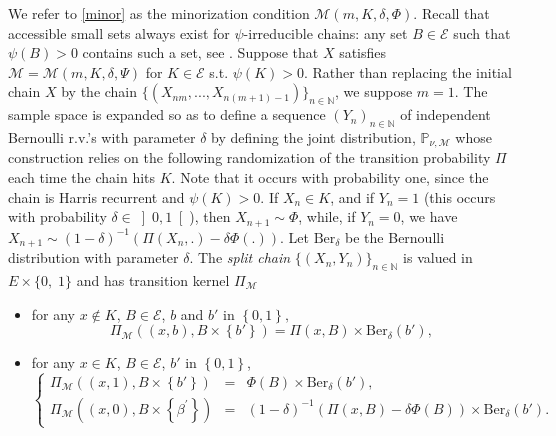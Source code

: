 \documentclass[sn-mathphys-ay]{sn-jnl}%
\newcommand{\smallSet}{K}
\begin{document}
\begin{appendices}
We refer to \eqref{minor} as the minorization condition $\mathcal{M}
    (m,K,\delta,\Phi).$ Recall that accessible small sets always exist for
$\psi$-irreducible chains: any set $B\in\mathcal{E}$ such that $\psi(B)>0$ contains
such a set, see \cite{JainJam}. Suppose that $X$ satisfies
$\mathcal{M}=\mathcal{M}(m,K,\delta,\Psi)$ for $K\in\mathcal{E}$ s.t. $\psi(K)>0.$
Rather than replacing the initial chain $X$ by the chain
$\{(X_{nm},...,X_{n(m+1)-1})\}_{n\in\mathbb{N}}$, we suppose $m=1$. The sample space
is expanded so as to define a sequence $(Y_{n})_{n\in\mathbb{N}}$ of independent
Bernoulli r.v.'s with parameter $\delta$ by defining the joint distribution,
$\mathbb{P}_{\nu,\mathcal{M}}$ whose construction relies on the following
randomization of the transition probability $\Pi$ each time the chain hits
$\smallSet$. Note that it occurs with probability one, since the chain is Harris
recurrent and $\psi(K)>0$. If $X_{n}\in K$, and if $Y_{n}=1$ (this occurs with
probability $\delta\in\left] 0,1\right[ $), then $X_{n+1}\sim \Phi$, while, if
$Y_{n}=0$, we have $X_{n+1}\sim (1-\delta)^{-1}(\Pi(X_{n},.)-\delta\Phi(.))$. Let
$\text{Ber}_{\delta}$ be the Bernoulli distribution with parameter $\delta$. The
\textit{split chain} $\{(X_{n},Y_{n})\}_{n\in\mathbb{N}}$ is valued in $E\times \{
    0,\; 1\} $ and has transition kernel $\Pi_{\mathcal{M}}$%
\begin{itemize}
    \item
          for any $x\notin K$, $B\in\mathcal{E}$, $b$ and $b'$ in $\left\{ 0,1\right\} ,$%
          \begin{equation*}
              \Pi_{\mathcal{M}}\left(  \left(  x,b \right)  ,B\times \left\{
              b'\right\}  \right)  =\Pi\left(  x,B\right)  \times \text{Ber}%
              _{\delta}(b'),
          \end{equation*}
    \item for any $x\in K$, $B\in\mathcal{E}$, $b'$ in $\left\{ 0,1\right\}$,
          \begin{equation*}
              \left\{
              \begin{array}{ccl}
                  \Pi_{\mathcal{M}}\left(  \left(  x,1\right)  ,B\times \left\{  b'\right\}  \right) & = & \Phi(B)\times \text{Ber}_{\delta}(b'),         \\
                  \Pi_{\mathcal{M}}\left(  \left(  x,0\right)  ,B\times \left\{  \beta^{\prime
                  }\right\}  \right)                                                                 & = & (1-\delta)^{-1}(\Pi\left(  x,B\right)  -\delta
                  \Phi(B))\times \text{Ber}_{\delta}(b').
              \end{array}
              \right.
          \end{equation*}
\end{itemize}


\end{appendices}
\end{document}
